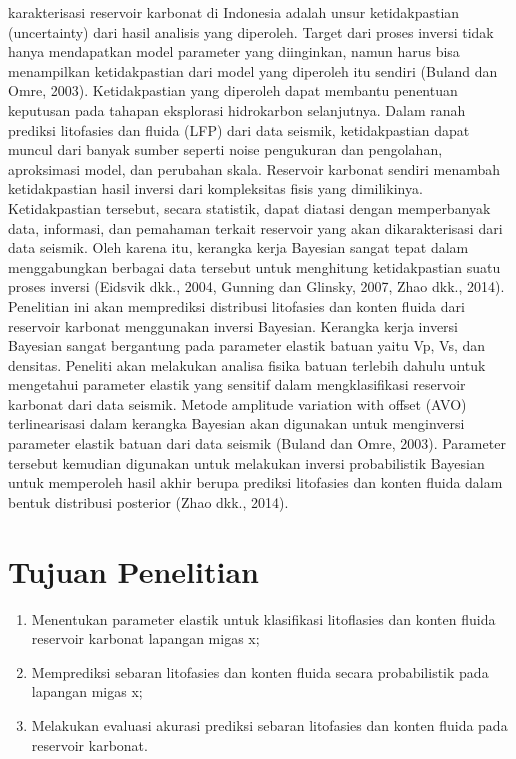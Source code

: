 \documentclass[main.tex]{subfiles}
\begin{document}
karakterisasi reservoir karbonat di Indonesia adalah unsur ketidakpastian
(uncertainty) dari hasil analisis yang diperoleh. Target dari proses inversi tidak
hanya mendapatkan model parameter yang diinginkan, namun harus bisa
menampilkan ketidakpastian dari model yang diperoleh itu sendiri (Buland dan
Omre, 2003). Ketidakpastian yang diperoleh dapat membantu penentuan
keputusan pada tahapan eksplorasi hidrokarbon selanjutnya. Dalam ranah prediksi
litofasies dan fluida (LFP) dari data seismik, ketidakpastian dapat muncul dari
banyak sumber seperti noise pengukuran dan pengolahan, aproksimasi model, dan
perubahan skala. Reservoir karbonat sendiri menambah ketidakpastian hasil
inversi dari kompleksitas fisis yang dimilikinya. Ketidakpastian tersebut, secara
statistik, dapat diatasi dengan memperbanyak data, informasi, dan pemahaman
terkait reservoir yang akan dikarakterisasi dari data seismik. Oleh karena itu,
kerangka kerja Bayesian sangat tepat dalam menggabungkan berbagai data
tersebut untuk menghitung ketidakpastian suatu proses inversi (Eidsvik dkk.,
2004, Gunning dan Glinsky, 2007, Zhao dkk., 2014).\\
\newline
Penelitian ini akan memprediksi distribusi litofasies dan konten fluida dari
reservoir karbonat menggunakan inversi Bayesian. Kerangka kerja inversi
Bayesian sangat bergantung pada parameter elastik batuan yaitu Vp, Vs, dan
densitas. Peneliti akan melakukan analisa fisika batuan terlebih dahulu untuk
mengetahui parameter elastik yang sensitif dalam mengklasifikasi reservoir
karbonat dari data seismik. Metode amplitude variation with offset (AVO)
terlinearisasi dalam kerangka Bayesian akan digunakan untuk menginversi
parameter elastik batuan dari data seismik (Buland dan Omre, 2003). Parameter
tersebut kemudian digunakan untuk melakukan inversi probabilistik Bayesian
untuk memperoleh hasil akhir berupa prediksi litofasies dan konten fluida dalam
bentuk distribusi posterior (Zhao dkk., 2014).


\section{Tujuan Penelitian}
\begin{enumerate}[itemsep = 0pt, parsep = 0pt]
    \item Menentukan parameter elastik untuk klasifikasi litoflasies dan konten fluida
    reservoir karbonat lapangan migas x;
    \item Memprediksi sebaran litofasies dan konten fluida secara probabilistik pada
    lapangan migas x;
    \item Melakukan evaluasi akurasi prediksi sebaran litofasies dan konten fluida pada
    reservoir karbonat.
\end{enumerate}
\end{document}
